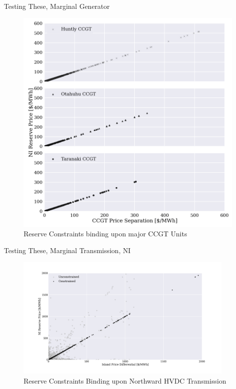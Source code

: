 \documentclass[xcolor=x11names,compress]{beamer}
\renewcommand{\(}{\begin{columns}}
\renewcommand{\)}{\end{columns}}
\newcommand{\<}[1]{\begin{column}{#1}}
\renewcommand{\>}{\end{column}}
\begin{document}
\begin{frame}{Testing These, Marginal Generator}
\begin{figure}
\includegraphics[scale=0.3]{img/ccgt_reserve_prices_offer_prices.png}
\caption{Reserve Constraints binding upon major CCGT Units}
\end{figure}
\end{frame}

\begin{frame}{Testing These, Marginal Transmission, NI}
\begin{figure}
\includegraphics[width=0.95\textwidth]{img/ni_reserve_prices_island_differential.png}
\caption{Reserve Constraints Binding upon Northward HVDC Transmission}
\end{figure}
\end{frame}
\end{document}
